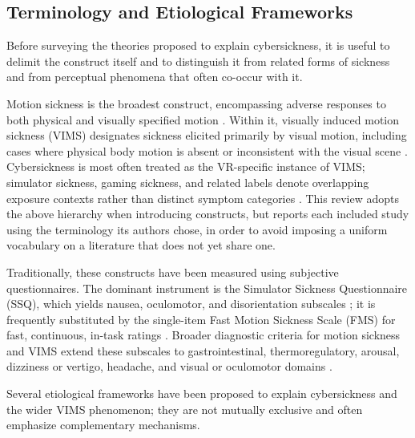 \subsection{Terminology and Etiological Frameworks}
Before surveying the theories proposed to explain cybersickness, it is useful to delimit the construct itself and to distinguish it from related forms of sickness and from perceptual phenomena that often co-occur with it.

Motion sickness is the broadest construct, encompassing adverse responses to both physical and visually specified motion \cite{lacknerMotionSicknessMore2014, keshavarzMotionSicknessCurrent2022}.
Within it, visually induced motion sickness (VIMS) designates sickness elicited primarily by visual motion, including cases where physical body motion is absent or inconsistent with the visual scene \cite{kennedyResearchVisuallyInduced2010, chaMotionSicknessDiagnostic2021}.
Cybersickness is most often treated as the VR-specific instance of VIMS; simulator sickness, gaming sickness, and related labels denote overlapping exposure contexts rather than distinct symptom categories \cite{cakirHandbookVirtualEnvironments2015, stanneyCybersicknessNotSimulator1997, rebenitschReviewCybersicknessApplications2016}.
This review adopts the above hierarchy when introducing constructs, but reports each included study using the terminology its authors chose, in order to avoid imposing a uniform vocabulary on a literature that does not yet share one.

Traditionally, these constructs have been measured using subjective questionnaires.
The dominant instrument is the Simulator Sickness Questionnaire (SSQ), which yields nausea, oculomotor, and disorientation subscales \cite{kennedySimulatorSicknessQuestionnaire1993}; it is frequently substituted by the single-item Fast Motion Sickness Scale (FMS) for fast, continuous, in-task ratings \cite{keshavarzValidatingEfficientMethod2011}.
Broader diagnostic criteria for motion sickness and VIMS extend these subscales to gastrointestinal, thermoregulatory, arousal, dizziness or vertigo, headache, and visual or oculomotor domains \cite{chaMotionSicknessDiagnostic2021}.

Several etiological frameworks have been proposed to explain cybersickness and the wider VIMS phenomenon; they are not mutually exclusive and often emphasize complementary mechanisms.

